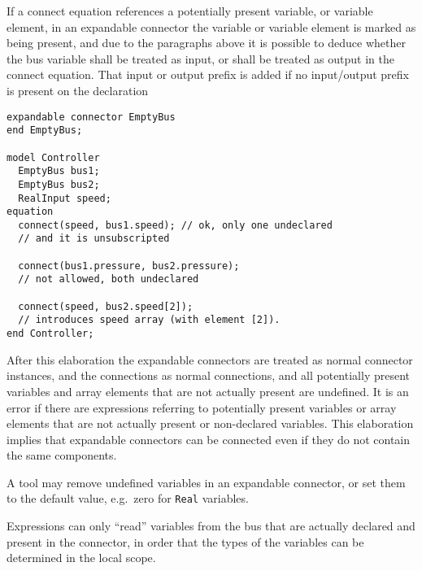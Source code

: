   If a connect equation references a potentially present variable, or
  variable element, in an expandable connector the variable or variable
  element is marked as being present, and due to the paragraphs above it
  is possible to deduce whether the bus variable shall be treated as
  input, or shall be treated as output in the connect equation. That
  input or output prefix is added if no input/output prefix is present
  on the declaration

\begin{example}
\begin{lstlisting}[language=modelica]
expandable connector EmptyBus
end EmptyBus;

model Controller
  EmptyBus bus1;
  EmptyBus bus2;
  RealInput speed;
equation
  connect(speed, bus1.speed); // ok, only one undeclared
  // and it is unsubscripted

  connect(bus1.pressure, bus2.pressure);
  // not allowed, both undeclared

  connect(speed, bus2.speed[2]);
  // introduces speed array (with element [2]).
end Controller;
\end{lstlisting}
\end{example}

After this elaboration the expandable connectors are treated as normal
connector instances, and the connections as normal connections, and all
potentially present variables and array elements that are not actually
present are undefined. It is an error if there
are expressions referring to potentially present variables or array
elements that are not actually present or non-declared variables. This
elaboration implies that expandable connectors can be connected even if
they do not contain the same components.

\begin{nonnormative}
A tool may remove undefined variables in an expandable connector, or set them to the default value, e.g.\ zero for \lstinline!Real! variables.
\end{nonnormative}

\begin{nonnormative}
Expressions can only ``read'' variables from the bus that
are actually declared and present in the connector, in order that the
types of the variables can be determined in the local scope.
\end{nonnormative}

